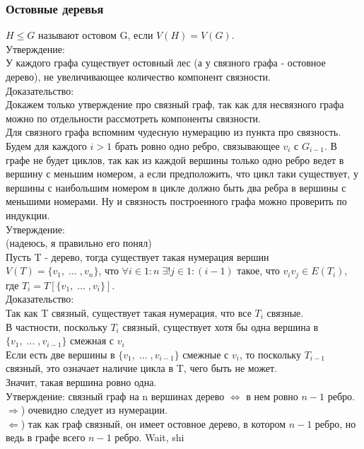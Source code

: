 \subsubsection{Остовные деревья}
$H \leq G$ называют остовом G, если $V(H) = V(G)$.\\
Утверждение:\\
У каждого графа существует остовный лес (а у связного графа - остовное дерево), не увеличивающее количество компонент связности.\\
Доказательство:\\
Докажем только утверждение про связный граф, так как для несвязного графа можно по отдельности рассмотреть компоненты связности.\\
Для связного графа вспомним чудесную нумерацию из пункта про связность. Будем для каждого $i > 1$ брать ровно одно ребро, связывающее $v_i$ с $G_{i - 1}$. В графе не будет циклов, так как из каждой вершины только одно ребро ведет в вершину с меньшим номером, а если предположить, что цикл таки существует, у вершины с наибольшим номером в цикле должно быть два ребра в вершины с меньшими номерами. Ну и связность построенного графа можно проверить по индукции.\\
Утверждение:\\
(надеюсь, я правильно его понял)\\
Пусть T - дерево, тогда существует такая нумерация вершин $V(T) = \{v_1, \; ... \; , v_n\}$, что $\forall i \in 1:n \; \exists! j \in 1:(i - 1)$ такое, что $v_iv_j \in E(T_i)$, где $T_i = T[\{v_1, \; ... \; , v_i\}]$.\\
Доказательство:\\
Так как T связный, существует такая нумерация, что все $T_i$ связные.\\
В частности, поскольку $T_i$ связный, существует хотя бы одна вершина в $\{v_1, \; ... \; , v_{i - 1}\}$ смежная с $v_i$\\
Если есть две вершины в $\{v_1, \; ... \; , v_{i - 1}\}$ смежные с $v_i$, то поскольку $T_{i - 1}$ связный, это означает наличие цикла в T, чего быть не может.\\
Значит, такая вершина ровно одна.\\
Утверждение: связный граф на n вершинах дерево $\Leftrightarrow$ в нем ровно $n - 1$ ребро.\\
$\Rightarrow$) очевидно следует из нумерации.\\
$\Leftarrow$) так как граф связный, он имеет остовное дерево, в котором $n - 1$ ребро, но ведь в графе всего $n - 1$ ребро. Wait, shi~\\
